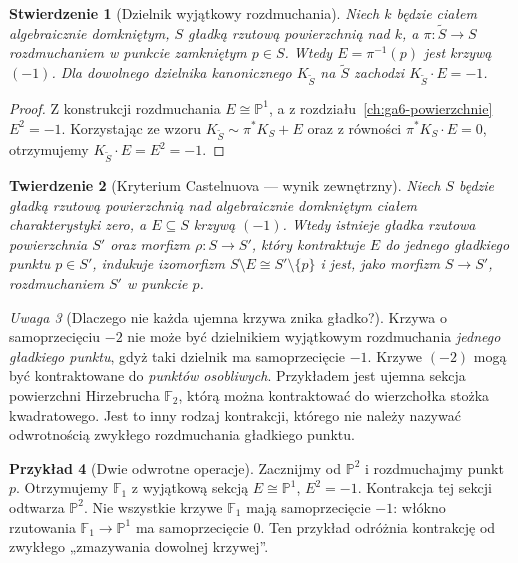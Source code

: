 \documentclass[11pt,a4paper,openany]{report}
\numberwithin{equation}{section}
\theoremstyle{plain}
\newtheorem{twierdzenie}{Twierdzenie}[section]
\newtheorem{stwierdzenie}[twierdzenie]{Stwierdzenie}
\theoremstyle{definition}
\newtheorem{przyklad}[twierdzenie]{Przykład}
\theoremstyle{remark}
\newtheorem{uwaga}[twierdzenie]{Uwaga}
\newcommand{\PP}{\mathbb P}
\begin{document}
\begin{stwierdzenie}[Dzielnik wyjątkowy rozdmuchania]
\label{st:ga8-exceptional-curve}
Niech $k$ będzie ciałem algebraicznie domkniętym,
$S$ gładką rzutową powierzchnią nad $k$, a
$\pi:\widetilde S\to S$ rozdmuchaniem w punkcie
zamkniętym $p\in S$. Wtedy
$E=\pi^{-1}(p)$ jest krzywą $(-1)$.
Dla dowolnego dzielnika kanonicznego $K_{\widetilde S}$
na $\widetilde S$ zachodzi $K_{\widetilde S}\cdot E=-1$.
\end{stwierdzenie}
\begin{proof}
Z konstrukcji rozdmuchania $E\cong\PP^1$, a z
rozdziału~\ref{ch:ga6-powierzchnie} $E^2=-1$.
Korzystając ze wzoru $K_{\widetilde S}\sim\pi^*K_S+E$
oraz z równości $\pi^*K_S\cdot E=0$, otrzymujemy
$K_{\widetilde S}\cdot E=E^2=-1$.
\end{proof}

\begin{twierdzenie}[Kryterium Castelnuova — wynik zewnętrzny]
\label{tw:ga8-castelnuovo}
Niech $S$ będzie gładką rzutową powierzchnią nad
algebraicznie domkniętym ciałem charakterystyki zero,
a $E\subseteq S$ krzywą $(-1)$. Wtedy istnieje
gładka rzutowa powierzchnia $S'$ oraz morfizm
$\rho:S\to S'$, który kontraktuje $E$ do jednego gładkiego punktu
$p\in S'$, indukuje izomorfizm $S\setminus E
\cong S'\setminus\{p\}$ i jest, jako morfizm
$S\to S'$, rozdmuchaniem $S'$ w punkcie $p$.
\end{twierdzenie}

\begin{uwaga}[Dlaczego nie każda ujemna krzywa znika gładko?]
Krzywa o samoprzecięciu $-2$ nie może być dzielnikiem
wyjątkowym rozdmuchania \emph{jednego gładkiego punktu},
gdyż taki dzielnik ma samoprzecięcie $-1$.
Krzywe $(-2)$ mogą być kontraktowane do \emph{punktów osobliwych}.
Przykładem jest ujemna sekcja powierzchni Hirzebrucha
$\mathbb F_2$, którą można kontraktować do wierzchołka
stożka kwadratowego. Jest to inny rodzaj kontrakcji,
którego nie należy nazywać odwrotnością zwykłego
rozdmuchania gładkiego punktu.
\end{uwaga}

\begin{przyklad}[Dwie odwrotne operacje]
Zacznijmy od $\PP^2$ i rozdmuchajmy punkt $p$.
Otrzymujemy $\mathbb F_1$ z wyjątkową sekcją
$E\cong\PP^1$, $E^2=-1$. Kontrakcja tej sekcji
odtwarza $\PP^2$. Nie wszystkie krzywe $\mathbb F_1$
mają samoprzecięcie $-1$: włókno rzutowania
$\mathbb F_1\to\PP^1$ ma samoprzecięcie $0$.
Ten przykład odróżnia kontrakcję od zwykłego
„zmazywania dowolnej krzywej”.
\end{przyklad}
\end{document}
